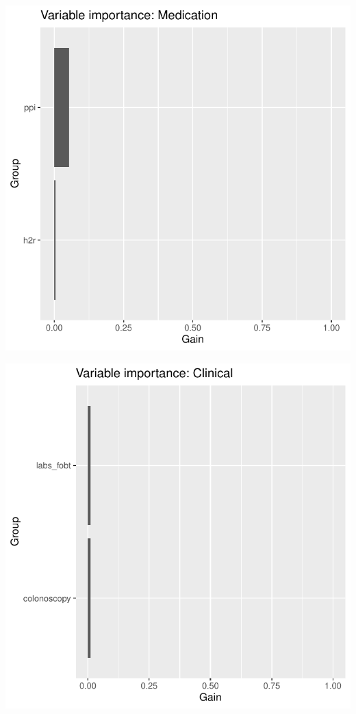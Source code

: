 \documentclass[12pt]{article}
\begin{document}
\begin{center}
\includegraphics[width=\textwidth]{figures/vi_group_Medication_.pdf}
\end{center}
\begin{center}
\includegraphics[width=\textwidth]{figures/vi_group_Clinical_.pdf}
\end{center}
\end{document}
